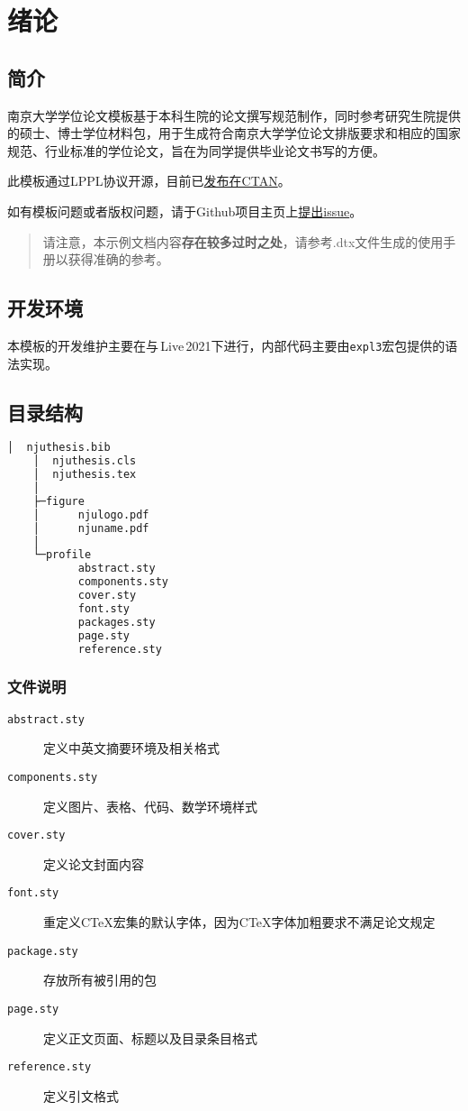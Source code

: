 \chapter{绪论}

\section{简介}
南京大学学位论文模板\cite{njuthesis}基于本科生院的论文撰写规范制作，同时参考研究生院提供的硕士、博士学位材料包，用于生成符合南京大学学位论文排版要求和相应的国家规范、行业标准的学位论文，旨在为同学提供毕业论文书写的方便。

此模板通过LPPL协议开源，目前已\href{https://ctan.org/pkg/njuthesis}{发布在CTAN}。

如有模板问题或者版权问题，请于Github项目主页上\href{https://github.com/nju-lug/NJUThesis/issues}{提出issue}。

\begin{quotation}
    请注意，本示例文档内容\textbf{存在较多过时之处}，请参考.dtx文件生成的使用手册以获得准确的参考。
\end{quotation}

\section{开发环境}

本模板的开发维护主要在与\,Live\,2021下进行，内部代码主要由\lstinline|expl3|宏包提供的语法实现。

\section{目录结构}
\label{sec:directory}

\begin{lstlisting}[language=bash]
    │  njuthesis.bib
    │  njuthesis.cls
    │  njuthesis.tex
    │
    ├─figure
    │      njulogo.pdf
    │      njuname.pdf
    │
    └─profile
           abstract.sty
           components.sty
           cover.sty
           font.sty
           packages.sty
           page.sty
           reference.sty
\end{lstlisting}

\subsection{文件说明}
\begin{description}
    \item [\texttt{abstract.sty}] 定义中英文摘要环境及相关格式
    \item [\texttt{components.sty}] 定义图片、表格、代码、数学环境样式
    \item [\texttt{cover.sty}] 定义论文封面内容
    \item [\texttt{font.sty}] 重定义CTeX宏集的默认字体，因为CTeX字体加粗要求不满足论文规定
    \item [\texttt{package.sty}] 存放所有被引用的包
    \item [\texttt{page.sty}] 定义正文页面、标题以及目录条目格式
    \item [\texttt{reference.sty}] 定义引文格式
\end{description}


